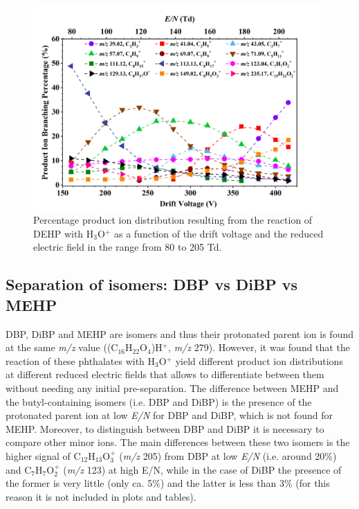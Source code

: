 \begin{figure}[htb]%
\centering
\includegraphics[height=0.35\textheight]{pics/DEHP-BR.png}
\caption{Percentage product ion distribution  resulting from the reaction of DEHP with H$_3$O$^+$ as a function of the drift voltage and the reduced electric field in the range from 80 to 205 Td.}
\label{fig:PH_DEHP_fs}
\end{figure}







\subsection{Separation of isomers: DBP vs DiBP vs MEHP }
DBP, DiBP and MEHP are isomers and thus their protonated parent ion is found at the same \textit{m/z} value ((C$_{16}$H$_{22}$O$_4$)H$^+$, \textit{m/z} 279).
%
However, it was found that the reaction of these phthalates with H$_3$O$^+$ yield different product ion distributions at different reduced electric fields that allows to differentiate between them without needing any initial pre-separation.
%
The difference between MEHP and the butyl-containing isomers (i.e. DBP and DiBP)  is the presence of the protonated parent ion at low \textit{E/N} for DBP and DiBP, which is not found for MEHP.
Moreover, to distinguish between DBP and DiBP it is necessary to compare other minor ions.
%
The main differences between these two isomers is the higher signal of C$_{12}$H$_{13}$O$_3^+$ (\textit{m/z} 205) from DBP at low \textit{E/N} (i.e. around 20\%) and C$_{7}$H$_{7}$O$_2^+$ (\textit{m/z} 123) at high E/N, while in the case of DiBP the presence of the former is very little (only ca. 5\%) and the latter is less than 3\% (for this reason it is not included in plots and tables). 















